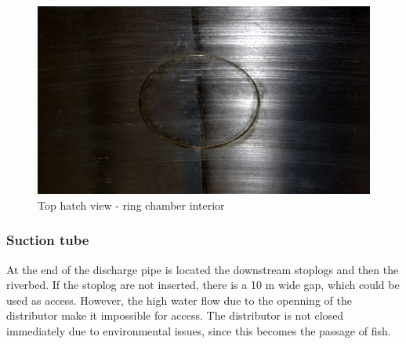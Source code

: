 \begin{figure}[h!]	
	\includegraphics[width=\columnwidth]{figs/viagem/2015_04_28/UG/img_4982}
	\caption{Top hatch view - ring chamber interior}
	\label{fig::esc_sup_int}
\end{figure}

\subsubsection{Suction tube}

At the end of the discharge pipe is located the downstream stoplogs and then the
riverbed. If the stoplog are not inserted, there is a 10 m wide gap, which
could be used as access. However, the high water flow due to the
openning of the distributor make it impossible for access. The distributor is
not closed immediately due to environmental issues, since this becomes the
passage of fish.


